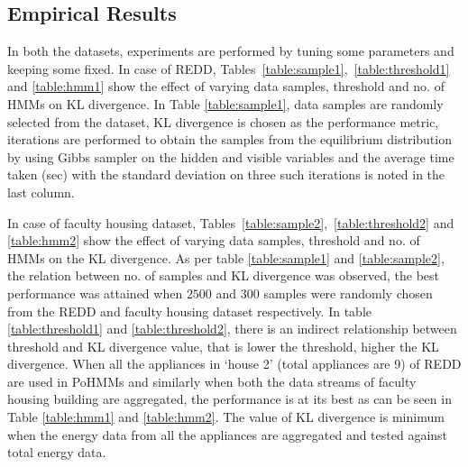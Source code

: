 \documentclass[runningheads,a4paper]{llncs}
\begin{document}
\subsection{Empirical Results}
In both the datasets, experiments are performed by tuning some parameters and keeping some fixed.
In case of REDD, Tables~\ref{table:sample1},~\ref{table:threshold1} and \ref{table:hmm1} show the effect of varying data samples, threshold and no. of HMMs on KL divergence. In Table \ref{table:sample1}, data samples are randomly selected from the dataset, KL divergence is chosen as the performance metric, iterations are performed to obtain the samples from the equilibrium distribution by using Gibbs sampler on the hidden and visible variables and the average time taken (sec) with the standard deviation on three such iterations is noted in the last column.

 In case of faculty housing dataset, Tables~\ref{table:sample2},~\ref{table:threshold2} and \ref{table:hmm2} show the effect of varying data samples, threshold and no. of HMMs on the KL divergence. As per table \ref{table:sample1} and \ref{table:sample2}, the relation between no. of samples and KL divergence was observed, the best performance was attained when $2500$ and $300$ samples were randomly chosen from the REDD and faculty housing dataset respectively. In table \ref{table:threshold1} and \ref{table:threshold2}, there is an indirect relationship between threshold and KL divergence value, that is lower the threshold, higher the KL divergence. 
When all the appliances in `house 2' (total appliances are $9$) of REDD are used in PoHMMs and similarly when both the data streams of faculty housing building are aggregated, the performance is at its best as can be seen in Table \ref{table:hmm1} and \ref{table:hmm2}. The value of KL divergence is minimum when the energy data from all the appliances are aggregated and tested against total energy data. %

\end{document}
